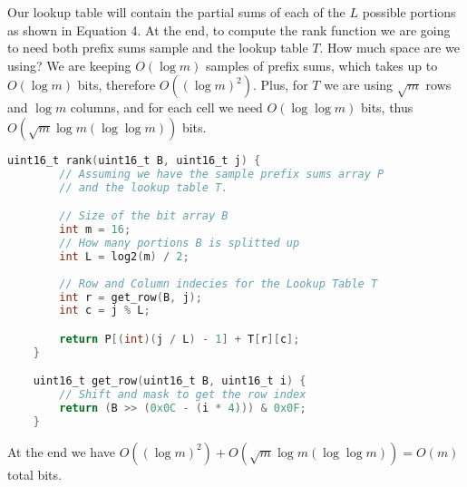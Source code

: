 \documentclass{article}
\begin{document}
\noindent Our lookup table will contain the partial sums of each of the $L$ possible portions as shown in Equation 4. At the end, to compute the rank function we are going to need
both prefix sums sample and the lookup table $T$. How much space are we using? We are keeping $O(\log m)$ samples of prefix sums, which takes up to $O(\log m)$ bits, therefore $O((\log{m})^2)$.
Plus, for $T$ we are using $\sqrt m$ rows and $\log m$ columns, and for each cell we need $O(\log \log m)$ bits, thus $O(\sqrt{m}\log m (\log \log m))$ bits.

\begin{lstlisting}[language=C,caption=`Rank function implemented using a bit array of 16 elements.']
    uint16_t rank(uint16_t B, uint16_t j) {
        // Assuming we have the sample prefix sums array P
        // and the lookup table T.

        // Size of the bit array B
        int m = 16; 
        // How many portions B is splitted up
        int L = log2(m) / 2;
        
        // Row and Column indecies for the Lookup Table T
        int r = get_row(B, j);
        int c = j % L;

        return P[(int)(j / L) - 1] + T[r][c];
    }

    uint16_t get_row(uint16_t B, uint16_t i) {
        // Shift and mask to get the row index
        return (B >> (0x0C - (i * 4))) & 0x0F;
    }
\end{lstlisting}

\noindent At the end we have $O((\log m)^2) + O(\sqrt{m}\log m (\log \log m)) = O(m)$ total bits.
\end{document}
